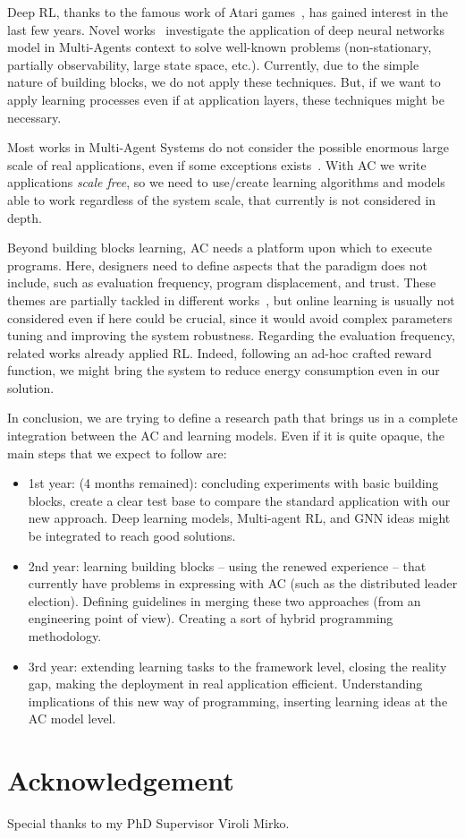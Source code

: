 \documentclass[conference]{IEEEtran}
\begin{document}
Deep RL, thanks to the famous work of Atari games~\cite{DBLP:journals/corr/HosuR16}, has gained interest in the last few years. Novel works~\cite{DBLP:journals/aamas/Hernandez-LealK19} investigate the application of deep neural networks model in Multi-Agents context
to solve well-known problems (non-stationary, partially observability, large state space, etc.). Currently, due to the simple nature of building blocks, we do not apply these techniques. But, if we want to apply learning processes even if
at application layers, these techniques might be necessary.

Most works in Multi-Agent Systems do not consider the possible enormous large scale of real applications, even if some exceptions exists~\cite{nguyen2018reinforcement}. With AC we write applications \emph{scale free}, so we need to use/create learning algorithms and models able to work
regardless of the system scale, that currently is not considered in depth.

Beyond building blocks learning, AC needs a platform upon which to execute programs. 
Here, designers need to define aspects that the paradigm does not include, 
such as evaluation frequency, program displacement, and trust. 
These themes are partially tackled in different works~\cite{DBLP:journals/scp/CasadeiAV18, DBLP:journals/fi/CasadeiPPVW20, DBLP:journals/corr/abs-2012-13806}, 
but online learning is usually not considered even if here could be crucial, 
since it would avoid complex parameters tuning and improving the system robustness.
Regarding the evaluation frequency, related works already applied RL. 
Indeed, following an ad-hoc crafted reward function, we might bring the system to reduce energy consumption even in our solution.

In conclusion, we are trying to define a research path that brings us in a complete integration between the AC and learning models. Even if it is quite opaque, the main
steps that we expect to follow are:
\begin{itemize}
    \item 1st year: (4 months remained): concluding experiments with basic building blocks, create a clear test base to compare the standard application with our new approach. Deep learning models, Multi-agent RL, and GNN ideas might be integrated to reach good solutions.
    \item 2nd year: learning building blocks -- using the renewed experience -- that currently have problems in expressing with AC (such as the distributed leader election).
    Defining guidelines in merging these two approaches (from an engineering point of view). Creating a sort of hybrid programming methodology.
    \item 3rd year: extending learning tasks to the framework level, closing the reality gap, making the deployment in real application efficient. Understanding implications of this new way of programming, inserting learning ideas at the AC model level. 
\end{itemize}
\section*{Acknowledgement}
Special thanks to my PhD Supervisor Viroli Mirko.


\end{document}
